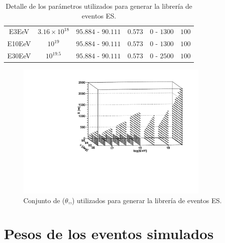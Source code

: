 \begin{table}
\begin{center}
\begin{tabular}{|c|c|cc|cc|}
				\multirow{2}{*}{E3EeV} & \multirow{2}{*}{$3.16\times10^{18}$} & \multirow{2}{*}{$95.884\text{ - }90.111$}  & \multirow{2}{*}{$0.573$} & \multirow{2}{*}{$0\text{ - }1300$} & \multirow{2}{*}{$100$}\\
				& & & & & \\
				
				\multirow{2}{*}{E10EeV} & \multirow{2}{*}{$10^{19}$} & \multirow{2}{*}{$95.884\text{ - }90.111$}  & \multirow{2}{*}{$0.573$} & \multirow{2}{*}{$0\text{ - }1300$} & \multirow{2}{*}{$100$} \\
				& & & & & \\
				
				\multirow{2}{*}{E30EeV} & \multirow{2}{*}{$10^{19.5}$} & \multirow{2}{*}{$95.884\text{ - }90.111$}  & \multirow{2}{*}{$0.573$} & \multirow{2}{*}{$0\text{ - }2500$} & \multirow{2}{*}{$100$} \\
				& & & & &\\
				\hline
				\end{tabular}
			\end{center}
			\caption{\label{tab:sim_table_es}
			Detalle de los parámetros utilizados para generar la librería de eventos ES.
			}
		\end{table}
		\begin{figure}[h!]
			\begin{center}
			\includegraphics[width=0.85\textwidth]{fig/simulacionAuger/3D_completeParameterSpace5}
			\caption{
			Conjunto de ($\theta$,\etau{},\xd{}) utilizados para generar la librería de eventos ES.
			}
			\label{fig:sim_fig_es}
			\end{center}
		\end{figure}
		
	\section{Pesos de los eventos simulados}
	
